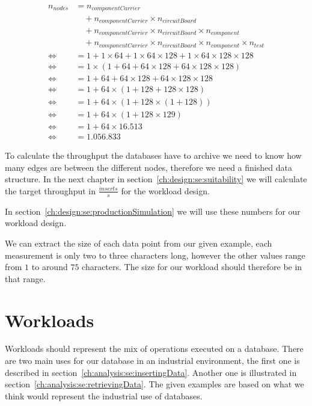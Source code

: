\begin{equation}
  \label{eq:dataAmount}
  \begin{aligned}
    n_{nodes} &= n_{componentCarrier} \\
    &\quad + n_{componentCarrier} \times n_{circuitBoard} \\
    &\quad + n_{componentCarrier} \times n_{circuitBoard} \times n_{component} \\
    &\quad + n_{componentCarrier} \times n_{circuitBoard} \times n_{component} \times n_{test} \\
    \iff &= 1 + 1 \times 64 + 1 \times 64 \times 128 + 1 \times 64 \times 128 \times 128 \\
    \iff &= 1 \times (1 + 64 + 64 \times 128 + 64 \times 128 \times 128) \\
    \iff &= 1 + 64 + 64 \times 128 + 64 \times 128 \times 128 \\
    \iff &= 1 + 64 \times (1 + 128 + 128 \times 128) \\
    \iff &= 1 + 64 \times (1 + 128 \times (1 + 128)) \\
    \iff &= 1 + 64 \times (1 + 128 \times 129) \\
    \iff &= 1 + 64 \times 16.513 \\
    \iff &= 1.056.833
  \end{aligned}
\end{equation}

To calculate the throughput the databases have to archive we need to know how many edges are between the different nodes,
therefore we need a finished data structure.
In the next chapter in section~\ref{ch:design:se:suitability} we will calculate the target throughput in $ \frac{inserts}{s} $ for the workload design.

In section~\ref{ch:design:se:productionSimulation} we will use these numbers for our workload design.

We can extract the size of each data point from our given example,
each measurement is only two to three characters long,
however the other values range from $ 1 $ to around $ 75 $ characters.
The size for our workload should therefore be in that range.

\section{Workloads}
\label{ch:analysis:se:workloads}
Workloads should represent the mix of operations executed on a database.
There are two main uses for our database in an industrial environment,
the first one is described in section~\ref{ch:analysis:se:insertingData}.
Another one is illustrated in section~\ref{ch:analysis:se:retrievingData}.
The given examples are based on what we think would represent the industrial use of databases.


